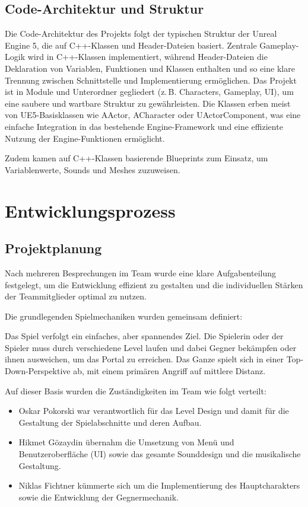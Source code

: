\documentclass[oneside]{ausarbeitung}
\begin{document}
\section{Code-Architektur und Struktur}
\label{sec:code-architekturundstruktur}

Die Code-Architektur des Projekts folgt der typischen Struktur der Unreal Engine 5, die auf C++-Klassen und Header-Dateien basiert. 
Zentrale Gameplay-Logik wird in C++-Klassen implementiert, während Header-Dateien die Deklaration von Variablen, Funktionen und Klassen enthalten und so eine klare Trennung zwischen Schnittstelle und Implementierung ermöglichen. 
Das Projekt ist in Module und Unterordner gegliedert (z. B. Characters, Gameplay, UI), um eine saubere und wartbare Struktur zu gewährleisten. 
Die Klassen erben meist von UE5-Basisklassen wie AActor, ACharacter oder UActorComponent, 
was eine einfache Integration in das bestehende Engine-Framework und eine effiziente Nutzung der Engine-Funktionen ermöglicht.

Zudem kamen auf C++-Klassen basierende Blueprints zum Einsatz, um Variablenwerte, Sounds und Meshes zuzuweisen.

\chapter{Entwicklungsprozess}
\label{cha:entwicklungsprozess}

\section{Projektplanung}
\label{sec:projektplanung}

Nach mehreren Besprechungen im Team wurde eine klare Aufgabenteilung festgelegt, um die Entwicklung effizient zu gestalten und die individuellen Stärken der Teammitglieder optimal zu nutzen. 

Die grundlegenden Spielmechaniken wurden gemeinsam definiert:

Das Spiel verfolgt ein einfaches, aber spannendes Ziel. Die Spielerin oder der Spieler muss durch verschiedene Level laufen und dabei Gegner bekämpfen oder ihnen ausweichen, um das Portal zu erreichen. Das Ganze spielt sich in einer Top-Down-Perspektive ab, mit einem primären Angriff auf mittlere Distanz.

Auf dieser Basis wurden die Zuständigkeiten im Team wie folgt verteilt:

\begin{itemize}
    \item Oskar Pokorski war verantwortlich für das Level Design und damit für die Gestaltung der Spielabschnitte und deren Aufbau.
    
    \item Hikmet Gözaydin übernahm die Umsetzung von Menü und Benutzeroberfläche (UI) sowie das gesamte Sounddesign und die musikalische Gestaltung.
    
    \item Niklas Fichtner kümmerte sich um die Implementierung des Hauptcharakters sowie die Entwicklung der Gegnermechanik.
\end{itemize}
\end{document}
